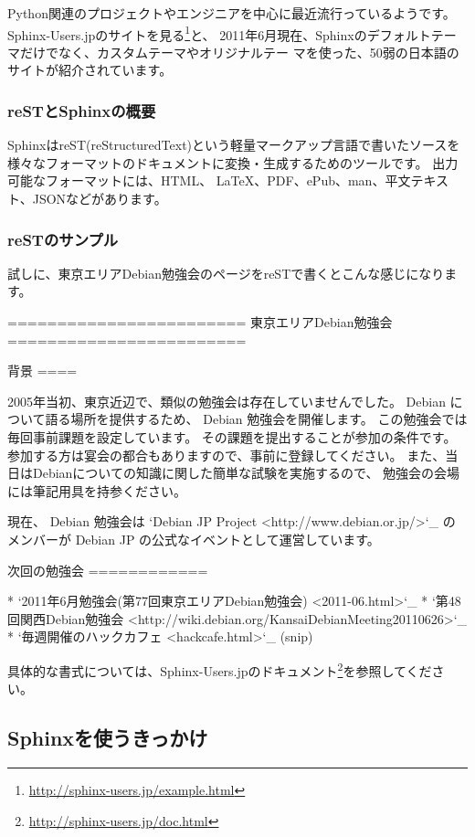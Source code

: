 \documentclass[mingoth,a4paper]{jsarticle}
\begin{document}
Python関連のプロジェクトやエンジニアを中心に最近流行っているようです。
Sphinx-Users.jpのサイトを見る\footnote{\url{http://sphinx-users.jp/example.html}}と、
2011年6月現在、Sphinxのデフォルトテーマだけでなく、カスタムテーマやオリジナルテー
マを使った、50弱の日本語のサイトが紹介されています。

\subsubsection{reSTとSphinxの概要}

SphinxはreST(reStructuredText)という軽量マークアップ言語で書いたソースを
様々なフォーマットのドキュメントに変換・生成するためのツールです。
出力可能なフォーマットには、HTML、 \LaTeX 、PDF、ePub、man、平文テキスト、JSONなどがあります。

\subsubsection{reSTのサンプル}

試しに、東京エリアDebian勉強会のページをreSTで書くとこんな感じになります。

\begin{commandline}
========================
 東京エリアDebian勉強会
========================


背景
====

2005年当初、東京近辺で、類似の勉強会は存在していませんでした。
Debian について語る場所を提供するため、 Debian 勉強会を開催します。
この勉強会では毎回事前課題を設定しています。
その課題を提出することが参加の条件です。
参加する方は宴会の都合もありますので、事前に登録してください。
また、当日はDebianについての知識に関した簡単な試験を実施するので、
勉強会の会場には筆記用具を持参ください。

現在、 Debian 勉強会は
`Debian JP Project <http://www.debian.or.jp/>`_
のメンバーが Debian JP の公式なイベントとして運営しています。

次回の勉強会
============

* `2011年6月勉強会(第77回東京エリアDebian勉強会) <2011-06.html>`_
* `第48回関西Debian勉強会 <http://wiki.debian.org/KansaiDebianMeeting20110626>`_
* `毎週開催のハックカフェ <hackcafe.html>`_
(snip)
\end{commandline}

具体的な書式については、Sphinx-Users.jpのドキュメント\footnote{\url{http://sphinx-users.jp/doc.html}}を参照してください。

\subsection{Sphinxを使うきっかけ}
\end{document}
